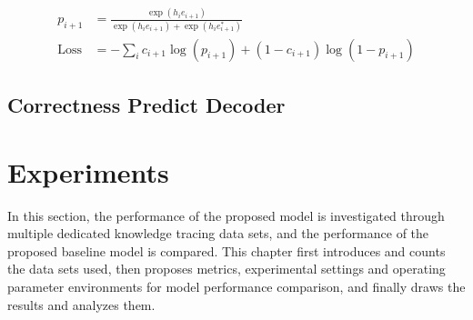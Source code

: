 

\begin{align}
	p_{i+1}     & =\frac{\exp (h_{i} e_{i+1})}{\exp (h_{i} e_{i+1})+\exp (h_{i} e_{i+1}^{*})} \\
	\text{Loss} & =-\sum_{i} c_{i+1} \log (p_{i+1})+(1-c_{i+1}) \log (1-p_{i+1})
\end{align}


\subsection{Correctness Predict Decoder}


\section{Experiments}
In this section, the performance of the proposed model is investigated through multiple dedicated knowledge tracing data sets, and the performance of the proposed baseline model is compared. This chapter first introduces and counts the data sets used, then proposes metrics, experimental settings and operating parameter environments for model performance comparison, and finally draws the results and analyzes them.


